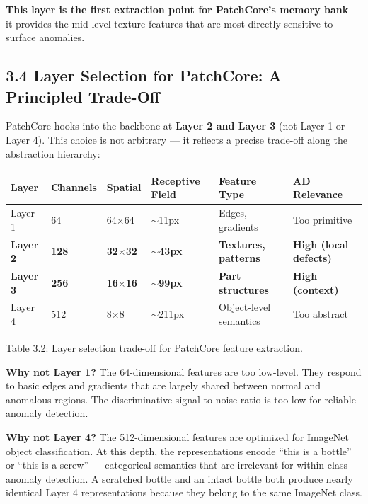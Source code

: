 \documentclass[12pt, a4paper, oneside]{report}
\begin{document}
\textbf{This layer is the first extraction point for PatchCore's memory bank} --- it provides the mid-level texture features that are most directly sensitive to surface anomalies.

\bigskip\noindent\hrulefill\bigskip

\subsection{3.4 Layer Selection for PatchCore: A Principled Trade-Off}\label{layer-selection-for-patchcore-a-principled-trade-off}

PatchCore hooks into the backbone at \textbf{Layer 2 and Layer 3} (not Layer 1 or Layer 4). This choice is not arbitrary --- it reflects a precise trade-off along the abstraction hierarchy:

{\def\LTcaptype{none} %
\begin{longtable}[]{@{}llllll@{}}
\toprule\noalign{}
Layer & Channels & Spatial & Receptive Field & Feature Type & AD Relevance \\
\midrule\noalign{}
\endhead
\bottomrule\noalign{}
\endlastfoot
Layer 1 & 64 & 64$\times$64 & ${\sim}$11px & Edges, gradients & Too primitive \\
\textbf{Layer 2} & \textbf{128} & \textbf{32$\times$32} & \textbf{${\sim}$43px} & \textbf{Textures, patterns} & \textbf{High (local defects)} \\
\textbf{Layer 3} & \textbf{256} & \textbf{16$\times$16} & \textbf{${\sim}$99px} & \textbf{Part structures} & \textbf{High (context)} \\
Layer 4 & 512 & 8$\times$8 & ${\sim}$211px & Object-level semantics & Too abstract \\
\end{longtable}
}

Table 3.2: Layer selection trade-off for PatchCore feature extraction.

\textbf{Why not Layer 1?} The 64-dimensional features are too low-level. They respond to basic edges and gradients that are largely shared between normal and anomalous regions. The discriminative signal-to-noise ratio is too low for reliable anomaly detection.

\textbf{Why not Layer 4?} The 512-dimensional features are optimized for ImageNet object classification. At this depth, the representations encode ``this is a bottle'' or ``this is a screw'' --- categorical semantics that are irrelevant for within-class anomaly detection. A scratched bottle and an intact bottle both produce nearly identical Layer 4 representations because they belong to the same ImageNet class.
\end{document}
